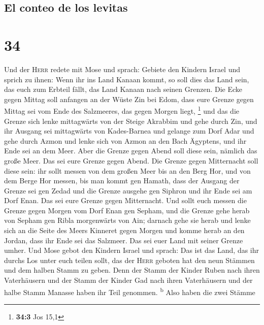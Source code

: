 \hypertarget{el-conteo-de-los-levitas}{%
\subsection{El conteo de los levitas}\label{el-conteo-de-los-levitas}}

\hypertarget{section-33}{%
\section{34}\label{section-33}}

 Und der \textsc{Herr} redete mit Mose und sprach:
 Gebiete den Kindern Israel und sprich zu ihnen: Wenn ihr
ins Land Kanaan kommt, so soll dies das Land sein, das euch zum Erbteil
fällt, das Land Kanaan nach seinen Grenzen.  Die Ecke
gegen Mittag soll anfangen an der Wüste Zin bei Edom, dass eure Grenze
gegen Mittag sei vom Ende des Salzmeeres, das gegen Morgen liegt,
\footnote{\textbf{34:3} Jos 15,1}  und das die Grenze sich
lenke mittagwärts von der Steige Akrabbim und gehe durch Zin, und ihr
Ausgang sei mittagwärts von Kades-Barnea und gelange zum Dorf Adar und
gehe durch Azmon  und lenke sich von Azmon an den Bach
Ägyptens, und ihr Ende sei an dem Meer.  Aber die Grenze
gegen Abend soll diese sein, nämlich das große Meer. Das sei eure Grenze
gegen Abend.  Die Grenze gegen Mitternacht soll diese
sein: ihr sollt messen von dem großen Meer bis an den Berg Hor,
 und von dem Berge Hor messen, bis man kommt gen Hamath,
dass der Ausgang der Grenze sei gen Zedad  und die Grenze
ausgehe gen Siphron und ihr Ende sei am Dorf Enan. Das sei eure Grenze
gegen Mitternacht.  Und sollt euch messen die Grenze
gegen Morgen vom Dorf Enan gen Sepham,  und die Grenze
gehe herab von Sepham gen Ribla morgenwärts von Ain; darnach gehe sie
herab und lenke sich an die Seite des Meers Kinneret gegen Morgen
 und komme herab an den Jordan, dass ihr Ende sei das
Salzmeer. Das sei euer Land mit seiner Grenze umher.  Und
Mose gebot den Kindern Israel und sprach: Das ist das Land, das ihr
durchs Los unter euch teilen sollt, das der \textsc{Herr} geboten hat
den neun Stämmen und dem halben Stamm zu geben.  Denn der
Stamm der Kinder Ruben nach ihren Vaterhäusern und der Stamm der Kinder
Gad nach ihren Vaterhäusern und der halbe Stamm Manasse haben ihr Teil
genommen. \textsuperscript{b}  Also haben die zwei Stämme
